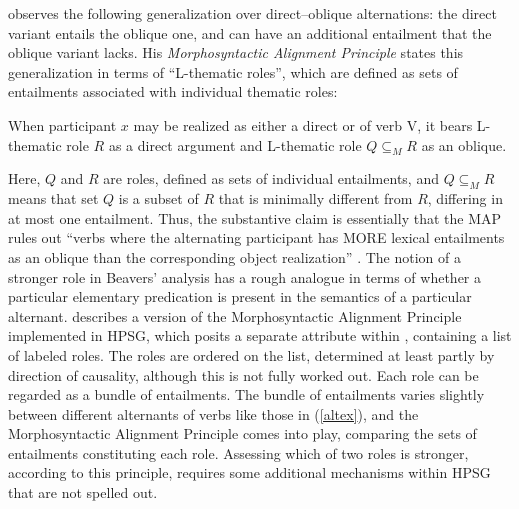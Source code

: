 \documentclass[output=paper
 	        ,biblatex
                ,babelshorthands
                ,newtxmath
                ,draftmode
                ,colorlinks, citecolor=brown
]{langscibook}
\begin{document}

\citet{Beavers2010} observes the following generalization over direct--oblique alternations:  the direct variant entails the oblique one, and can have an additional entailment that the oblique variant lacks.  
His \emph{Morphosyntactic Alignment Principle} states this generalization in terms of ``L-thematic roles'', which are defined as sets of entailments associated with individual thematic roles:   

\begin{exe}
\ex\label{beavers-map}
When participant $x$ may be realized as either a direct or  of verb V, it bears L-thematic role $R$ as a direct argument and L-thematic role $Q\subseteq_{M}R$ as an oblique.
\citep[848]{Beavers2010}
\end {exe}

\noindent
Here, $Q$ and $R$ are roles, defined as sets of individual entailments, and  $Q\subseteq_{M}R$ means that set $Q$ is a subset of $R$ that is minimally different from $R$, differing in at most one entailment.
Thus, the substantive claim is essentially that the MAP rules out ``verbs where the alternating participant has \textsc{MORE} lexical entailments as an oblique than the corresponding object realization'' \citep[849]{Beavers2010}.
The notion of a stronger role in Beavers' analysis has a rough analogue in terms of whether a particular elementary predication is present in the semantics of a particular alternant.
\citet{Beavers2005} describes a version of the Morphosyntactic Alignment Principle implemented in HPSG, which posits a separate  attribute within , containing a list of labeled roles.
The roles are ordered on the  list, determined at least partly by direction of causality, although this is not fully worked out.
Each role can be regarded as a bundle of entailments.
The bundle of entailments varies slightly between different alternants of verbs like those in (\ref{altex}), and the Morphosyntactic Alignment Principle comes into play, comparing the sets of entailments constituting each role.
Assessing which of two roles is stronger, according to this principle, requires some additional mechanisms within HPSG that are not spelled out.
\end{document}
